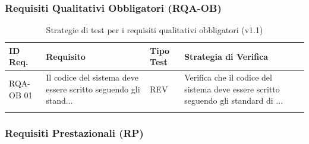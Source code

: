 \documentclass[a4paper,11pt,oneside]{scrartcl}
\begin{document}
\newpage
\subsubsection{Requisiti Qualitativi Obbligatori (RQA-OB)}

\begin{longtable}{|p{1.5cm}|p{5.5cm}|p{1.8cm}|p{5cm}|}
    \hline
    \textbf{ID Req.} & \textbf{Requisito}                                              & \textbf{Tipo Test} & \textbf{Strategia di Verifica}                                                      \\
    \hline
    RQA-OB 01        & Il codice del sistema deve essere scritto seguendo gli stand... & REV                & Verifica che il codice del sistema deve essere scritto seguendo gli standard di ... \\ \hline
    \caption{Strategie di test per i requisiti qualitativi obbligatori (v1.1)}
\end{longtable}

\newpage
\subsubsection{Requisiti Prestazionali (RP)}
\end{document}
